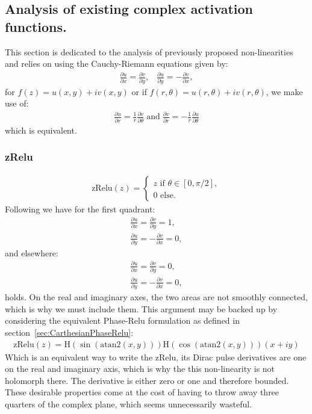 \documentclass{article}
\begin{document}
\subsection{Analysis of existing complex activation functions.}
This section is dedicated to the analysis of previously proposed non-linearities and relies on using the Cauchy-Riemann equations given by:
\begin{align}
\frac{\partial u}{\partial x} = \frac{\partial v}{\partial y}, \;\;\; \frac{\partial u}{\partial y} = - \frac{\partial v}{\partial x},
\end{align}
for $f(z) = u(x,y) + iv(x,y)$ or if $f(r, \theta) = u(r, \theta) + iv(r, \theta)$, we make use of:
\begin{align}
\frac{\partial u}{\partial r} = \frac{1}{r} \frac{\partial v}{\partial \theta} \; \text{and} \; \frac{\partial v}{\partial r} = - \frac{1}{r} \frac{\partial u}{\partial \theta}
\end{align}
which is equivalent.
\subsubsection{zRelu}
\begin{align}
\text{zRelu}(z) =\begin{cases} z \text{ if } \theta \in [0, \pi/2], \\
                               0 \text{  else}.
                 \end{cases}
\end{align}
Following \cite{Trabelsi} we have for the first quadrant:
\begin{align}
\frac{\partial u}{\partial x} = \frac{\partial v}{\partial y} = 1,\\
\frac{\partial u}{\partial y} = -\frac{\partial v}{\partial x} = 0, 
\end{align}
and elsewhere:
\begin{align}
\frac{\partial u}{\partial x} = \frac{\partial v}{\partial y} = 0,\\
\frac{\partial u}{\partial y} = -\frac{\partial v}{\partial x} = 0,
\end{align}
holds. On the real and imaginary axes, the two areas are not smoothly connected, which is why we must include them. This argument may be backed up by considering the equivalent Phase-Relu formulation as defined in section~\ref{sec:CarthesianPhaseRelu}:
\begin{align}
\text{zRelu}(z) = \text{H}(\sin(\text{atan2}(x,y)))\text{H}(\cos(\text{atan2}(x,y)))(x + iy)
\end{align}
Which is an equivalent way to write the zRelu, its Dirac pulse derivatives are one on the real and imaginary axis, which is why the this non-linearity is not holomorph there. The derivative is either zero or one and therefore bounded. These desirable properties come at the cost of having to throw away three quarters of the complex plane, which seems unnecessarily wasteful.
\end{document}
